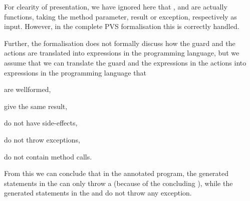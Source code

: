 For clearity of presentation, we have ignored here that \preset, \postset and
\excset are actually functions, taking the method parameter, result or
exception, respectively as input. However, in the complete PVS
formalisation this is correctly handled. 

Further, the formalisation does not formally discuss how the guard and
the actions are translated into expressions in the programming
language, but we assume that we can translate the guard and the
expressions in the actions into expressions in the programming
language that 
\begin{inparaenum}
\item are wellformed,
\item give the same result,
\item do not have side-effects, 
\item do not throw exceptions,
\item do not contain method calls.
\end{inparaenum}
From this we can conclude that in the annotated program, the generated
statements in the \preset can only throw a \JMLExc (because of the
concluding \Assert), while the generated statements in the \postset
and \excset do not throw any exception.

